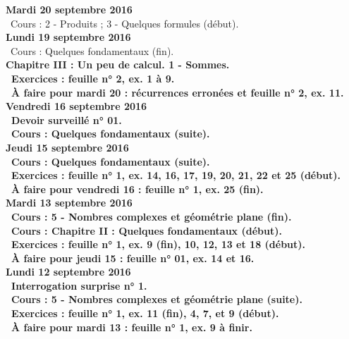 \documentclass[12pt,a4paper]{article}
\begin{document}
\noindent\textbf{\bf Mardi 20 septembre 2016}\\
\bu\ Cours : 2 - Produits ; 3 - Quelques formules (début).\vspace{.4cm}\\

\noindent\textbf{Lundi 19 septembre 2016}\\
\bu\ Cours : Quelques fondamentaux (fin).\\
\bf Chapitre III \rm : Un peu de calcul. 1 - Sommes.\\
\bu\ Exercices : feuille n° 2, ex. 1 à 9.\\
\bu\ À faire pour mardi 20 : récurrences erronées et feuille n° 2, ex. 11.\vspace{.4cm}\\

\noindent\textbf{Vendredi 16 septembre 2016}\\
\bu\ Devoir surveillé n° 01.\\
\bu\ Cours : Quelques fondamentaux (suite).\vspace{.4cm}\\

\noindent\textbf{Jeudi 15 septembre 2016}\\
\bu\ Cours : Quelques fondamentaux (suite).\\
\bu\ Exercices : feuille n° 1, ex. 14, 16, 17, 19, 20, 21, 22 et 25 (début).\\
\bu\ À faire pour vendredi 16 : feuille n° 1, ex. 25 (fin).\vspace{.4cm}\\
 
\noindent\textbf{\bf Mardi 13 septembre 2016}\\
\bu\ Cours : 5 - Nombres complexes et géométrie plane (fin).\\
\bu\ Cours : \bf Chapitre II \rm : Quelques fondamentaux (début).\\
\bu\ Exercices : feuille n° 1, ex. 9 (fin), 10, 12, 13 et 18 (début).\\
\bu\ À faire pour jeudi 15 : feuille n° 01, ex. 14 et 16.\vspace{.4cm}\\

\noindent\textbf{\bf Lundi 12 septembre 2016}\\
\bu\ Interrogation surprise n° 1.\\
\bu\ Cours : 5 - Nombres complexes et géométrie plane (suite).\\
\bu\ Exercices : feuille n° 1, ex. 11 (fin), 4, 7, et 9 (début).\\
\bu\ À faire pour mardi 13 : feuille n° 1, ex. 9 à finir.\vspace{.4cm}\\
 
\end{document}
